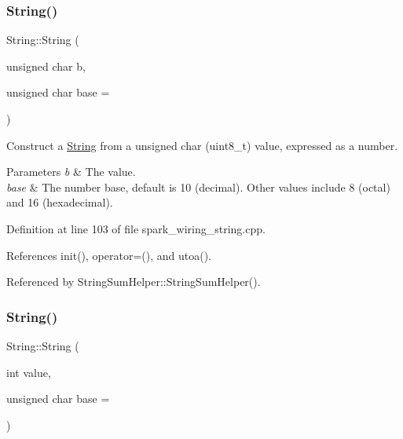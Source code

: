 \subsubsection{\texorpdfstring{String()}{String()}\hspace{0.1cm}{\footnotesize\ttfamily [7/13]}}
{\footnotesize\ttfamily String\+::\+String (\begin{DoxyParamCaption}\item[{unsigned char}]{b,  }\item[{unsigned char}]{base = {} }\end{DoxyParamCaption})\hspace{0.3cm}{\ttfamily [explicit]}}



Construct a \hyperlink{class_string}{String} from a unsigned char (uint8\+\_\+t) value, expressed as a number. 


\begin{DoxyParams}{Parameters}
{\em b} & The value.\\
\hline
{\em base} & The number base, default is 10 (decimal). Other values include 8 (octal) and 16 (hexadecimal). \\
\hline
\end{DoxyParams}


Definition at line 103 of file spark\+\_\+wiring\+\_\+string.\+cpp.



References init(), operator=(), and utoa().



Referenced by String\+Sum\+Helper\+::\+String\+Sum\+Helper().

\mbox{\label{class_string_a5528e1c6d322a9ee21f155c291ea67d1}} 
\subsubsection{\texorpdfstring{String()}{String()}\hspace{0.1cm}{\footnotesize\ttfamily [8/13]}}
{\footnotesize\ttfamily String\+::\+String (\begin{DoxyParamCaption}\item[{int}]{value,  }\item[{unsigned char}]{base = {} }\end{DoxyParamCaption})\hspace{0.3cm}{\ttfamily [explicit]}}



